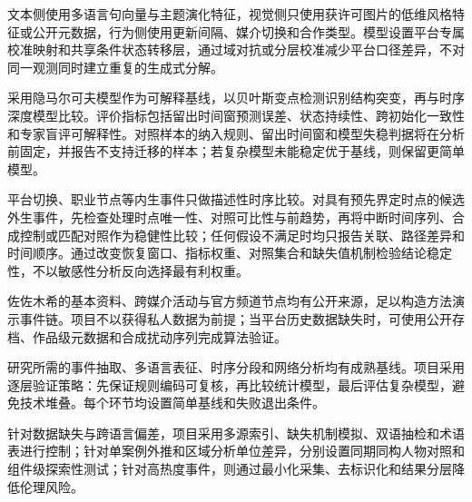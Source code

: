 文本侧使用多语言句向量与主题演化特征，视觉侧只使用获许可图片的低维风格特征或公开元数据，行为侧使用更新间隔、媒介切换和合作类型。模型设置平台专属校准映射和共享条件状态转移层，通过域对抗或分层校准减少平台口径差异，不对同一观测同时建立重复的生成式分解。

采用隐马尔可夫模型作为可解释基线，以贝叶斯变点检测识别结构突变，再与时序深度模型比较。评价指标包括留出时间窗预测误差、状态持续性、跨初始化一致性和专家盲评可解释性。对照样本的纳入规则、留出时间窗和模型失稳判据将在分析前固定，并报告不支持迁移的样本；若复杂模型未能稳定优于基线，则保留更简单模型。

平台切换、职业节点等内生事件只做描述性时序比较。对具有预先界定时点的候选外生事件，先检查处理时点唯一性、对照可比性与前趋势，再将中断时间序列、合成控制或匹配对照作为稳健性比较；任何假设不满足时均只报告关联、路径差异和时间顺序。通过改变恢复窗口、指标权重、对照集合和缺失值机制检验结论稳定性，不以敏感性分析反向选择最有利权重。


佐佐木希的基本资料、跨媒介活动与官方频道节点均有公开来源，足以构造方法演示事件链。项目不以获得私人数据为前提；当平台历史数据缺失时，可使用公开存档、作品级元数据和合成扰动序列完成算法验证。

研究所需的事件抽取、多语言表征、时序分段和网络分析均有成熟基线。项目采用逐层验证策略：先保证规则编码可复核，再比较统计模型，最后评估复杂模型，避免技术堆叠。每个环节均设置简单基线和失败退出条件。

针对数据缺失与跨语言偏差，项目采用多源索引、缺失机制模拟、双语抽检和术语表进行控制；针对单案例外推和区域分析单位差异，分别设置同期同构人物对照和组件级探索性测试；针对高热度事件，则通过最小化采集、去标识化和结果分层降低伦理风险。

